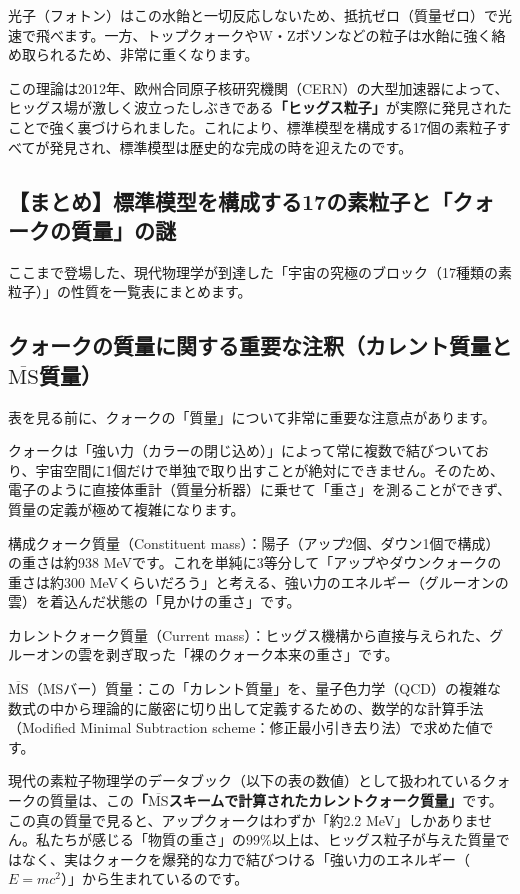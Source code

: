 光子（フォトン）はこの水飴と一切反応しないため、抵抗ゼロ（質量ゼロ）で光速で飛べます。一方、トップクォークやW・Zボソンなどの粒子は水飴に強く絡め取られるため、非常に重くなります。

この理論は2012年、欧州合同原子核研究機関（CERN）の大型加速器によって、ヒッグス場が激しく波立ったしぶきである\textbf{「ヒッグス粒子」}が実際に発見されたことで強く裏づけられました。これにより、標準模型を構成する17個の素粒子すべてが発見され、標準模型は歴史的な完成の時を迎えたのです。

\subsection{【まとめ】標準模型を構成する17の素粒子と「クォークの質量」の謎}

ここまで登場した、現代物理学が到達した「宇宙の究極のブロック（17種類の素粒子）」の性質を一覧表にまとめます。

\subsection{クォークの質量に関する重要な注釈（カレント質量と\(\overline{\mathrm{MS}}\)質量）}

表を見る前に、クォークの「質量」について非常に重要な注意点があります。

クォークは「強い力（カラーの閉じ込め）」によって常に複数で結びついており、宇宙空間に1個だけで単独で取り出すことが絶対にできません。そのため、電子のように直接体重計（質量分析器）に乗せて「重さ」を測ることができず、質量の定義が極めて複雑になります。

構成クォーク質量（Constituent mass）：陽子（アップ2個、ダウン1個で構成）の重さは約938 MeVです。これを単純に3等分して「アップやダウンクォークの重さは約300 MeVくらいだろう」と考える、強い力のエネルギー（グルーオンの雲）を着込んだ状態の「見かけの重さ」です。

カレントクォーク質量（Current mass）：ヒッグス機構から直接与えられた、グルーオンの雲を剥ぎ取った「裸のクォーク本来の重さ」です。

\(\overline{\mathrm{MS}}\)（MSバー）質量：この「カレント質量」を、量子色力学（QCD）の複雑な数式の中から理論的に厳密に切り出して定義するための、数学的な計算手法（Modified Minimal Subtraction scheme：修正最小引き去り法）で求めた値です。

現代の素粒子物理学のデータブック（以下の表の数値）として扱われているクォークの質量は、この\textbf{「\(\overline{\mathrm{MS}}\)スキームで計算されたカレントクォーク質量」}です。この真の質量で見ると、アップクォークはわずか「約2.2 MeV」しかありません。私たちが感じる「物質の重さ」の99\%以上は、ヒッグス粒子が与えた質量ではなく、実はクォークを爆発的な力で結びつける「強い力のエネルギー（\(E=mc^2\)）」から生まれているのです。


